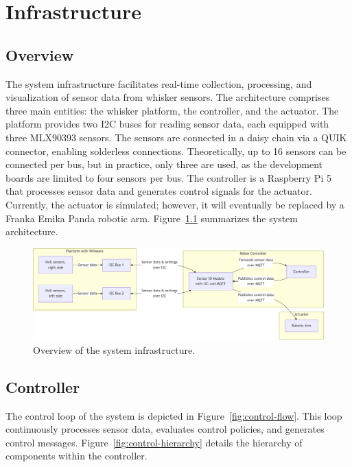 

\chapter{Infrastructure}


\section{Overview}
The system infrastructure facilitates real-time collection, processing, and visualization of sensor data from whisker sensors.
The architecture comprises three main entities: the whisker platform, the controller, and the actuator.
The platform provides two I2C buses for reading sensor data, each equipped with three MLX90393 sensors.
The sensors are connected in a daisy chain via a QUIK connector, enabling solderless connections.
Theoretically, up to 16 sensors can be connected per bus, but in practice, only three are used, as the development boards are limited to four sensors per bus.
The controller is a Raspberry Pi 5 that processes sensor data and generates control signals for the actuator.
Currently, the actuator is simulated; however, it will eventually be replaced by a Franka Emika Panda robotic arm.
Figure~\ref{fig:infrastructure_overview} summarizes the system architecture.

\begin{figure}[htb]
    \centering
    \includegraphics[width=\textwidth]{figures/diagrams/infrastructure-overview}
    \caption{Overview of the system infrastructure.}
    \label{fig:infrastructure_overview}
\end{figure}


\section{Controller}
The control loop of the system is depicted in Figure~\ref{fig:control-flow}.
This loop continuously processes sensor data, evaluates control policies, and generates control messages.
Figure~\ref{fig:control-hierarchy} details the hierarchy of components within the controller.

